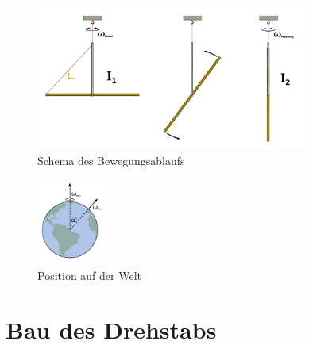 \documentclass[11pt]{scrartcl}
\begin{document}
\begin{figure}[ht]
\begin{center}
\includegraphics[width=0.8\textwidth]{prinzip.pdf}
\end{center}
\vspace{-1.5\baselineskip}
\caption{Schema des Bewegungsablaufs}
\label{prinzip}
\end{figure}

\begin{figure}[ht]
\begin{center}
\includegraphics[width=0.2\textwidth]{welt.pdf}
\end{center}
\vspace{-1.5\baselineskip}
\caption{Position auf der Welt}
\label{Welt}
\end{figure}

\section{Bau des Drehstabs} %

\end{document}

